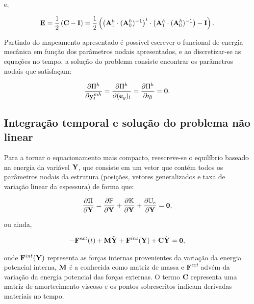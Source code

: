 \noindent e,

\begin{align}
	\mathbf{E} = \frac{1}{2}\left(\mathbf{C} - \mathbf{I}\right) = \frac{1}{2}\left(\left(\mathbf{A}^{h}_{1} \cdot (\mathbf{A}^{h}_{0})^{-1}\right)^{t} \cdot \left(\mathbf{A}^{h}_{1} \cdot (\mathbf{A}^{h}_{0})^{-1}\right) - \mathbf{I}\right).
\end{align}


Partindo do mapeamento apresentado é possível escrever o funcional de energia mecânica em função dos parâmetros nodais apresentados, e ao discretizar-se as equações no tempo, a solução do problema consiste encontrar os parâmetros nodais que satisfaçam:

\begin{align}
	\frac{\partial\Pi^{h}}{\partial \mathbf{y}_{l}^{mh}} = \frac{\partial\Pi^{h}}{\partial (\mathbf{e}_y)_l} = \frac{\partial\Pi^{h}}{\partial \eta_l} = \mathbf{0}.
\end{align}

\subsection{Integração temporal e solução do problema não linear}

Para a tornar o equacionamento mais compacto, reescreve-se o equilíbrio baseado na energia da variável $\mathbf{Y}$, que consiste em um vetor que contém todos os parâmetros nodais da estrutura (posições, vetores generalizados e taxa de variação linear da espessura) de forma que:

\begin{align}
	\frac{\partial\Pi}{\partial\mathbf{Y}} = \frac{\partial\mathbb{P}}{\partial \mathbf{Y}} + \frac{\partial\mathbb{K}}{\partial \mathbf{Y}} + \frac{\partial\mathbb{U}_e}{\partial \mathbf{Y}} = \mathbf{0},
\end{align}

\noindent ou ainda,

\begin{align}
	- \mathbf{F}^{ext}(t) + \mathbf{M}\ddot{\mathbf{Y}}_{}+ \mathbf{F}^{int}(\mathbf{Y}) + \mathbf{C}\dot{\mathbf{Y}}_{} = \mathbf{0}, \label{eq:equi_forma_matricial}
\end{align}

\noindent onde $ \mathbf{F}^{int}(\mathbf{Y})$ representa as forças internas provenientes da variação da energia potencial interna, $\mathbf{M}$ é a conhecida como matriz de massa e $\mathbf{F}^{ext}$ advém da variação da energia potencial das forças externas. O termo $\mathbf{C}$ representa uma matriz de amortecimento viscoso e os pontos sobrescritos indicam derivadas materiais no tempo.

